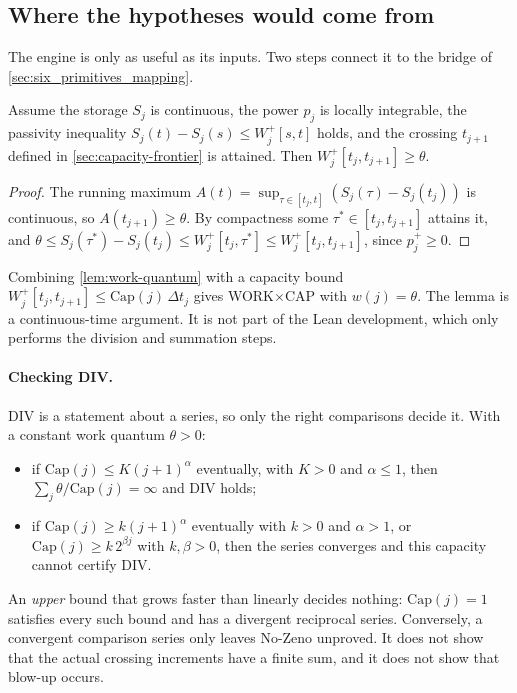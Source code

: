 \subsection{Where the hypotheses would come from}

The engine is only as useful as its inputs. Two steps connect it to the bridge of
\cref{sec:six_primitives_mapping}.

\begin{lemma}\label{lem:work-quantum}
Assume the storage $S_j$ is continuous, the power $p_j$ is locally integrable, the passivity
inequality $S_j(t)-S_j(s)\le W_j^+[s,t]$ holds, and the crossing $t_{j+1}$ defined in
\cref{sec:capacity-frontier} is attained. Then $W_j^+[t_j,t_{j+1}]\ge\theta$.
\end{lemma}

\begin{proof}
The running maximum $A(t)=\sup_{\tau\in[t_j,t]}(S_j(\tau)-S_j(t_j))$ is continuous, so
$A(t_{j+1})\ge\theta$. By compactness some $\tau^\ast\in[t_j,t_{j+1}]$ attains it, and
$\theta\le S_j(\tau^\ast)-S_j(t_j)\le W_j^+[t_j,\tau^\ast]\le W_j^+[t_j,t_{j+1}]$, since $p_j^+\ge0$.
\end{proof}

Combining \cref{lem:work-quantum} with a capacity bound $W_j^+[t_j,t_{j+1}]\le\mathrm{Cap}(j)\,\Delta t_j$
gives WORK$\times$CAP with $w(j)=\theta$. The lemma is a continuous-time argument. It is not part of
the Lean development, which only performs the division and summation steps.

\paragraph{Checking DIV.}
DIV is a statement about a series, so only the right comparisons decide it. With a constant work
quantum $\theta>0$:
\begin{itemize}
\item if $\mathrm{Cap}(j)\le K(j+1)^\alpha$ eventually, with $K>0$ and $\alpha\le1$, then
$\sum_j\theta/\mathrm{Cap}(j)=\infty$ and DIV holds;
\item if $\mathrm{Cap}(j)\ge k(j+1)^\alpha$ eventually with $k>0$ and $\alpha>1$, or
$\mathrm{Cap}(j)\ge k\,2^{\beta j}$ with $k,\beta>0$, then the series converges and this capacity cannot
certify DIV.
\end{itemize}
An \emph{upper} bound that grows faster than linearly decides nothing: $\mathrm{Cap}(j)=1$ satisfies
every such bound and has a divergent reciprocal series. Conversely, a convergent comparison series
only leaves No-Zeno unproved. It does not show that the actual crossing increments have a finite
sum, and it does not show that blow-up occurs.

